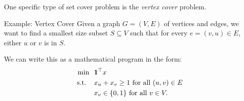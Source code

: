 %
%
%
%
%
%



One specific type of set cover problem is the \emph{vertex cover} problem.
\begin{general}{Example: Vertex Cover}{\npcomplete}
\label{ex:vertex-cover}
Given a graph $G = (V,E)$ of vertices and edges, we want to find a smallest size subset $S \subseteq V$ such that for every $e = (v,u) \in E$, either $u$ or $v$ is in $S$.   

We can write this as a mathematical program in the form:
\begin{equation}
\begin{split}
\min \ \ & \mathbf{1}^\top x\\
\text{ s.t. } \ \ & x_u + x_v \geq 1 \text{ for all } (u,v) \in E \\ 
& x_v \in \{0,1\} \text{ for all } v \in V.
\end{split}
\end{equation}
\end{general}




